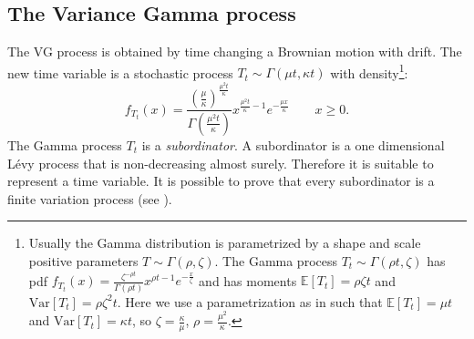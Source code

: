 \documentclass[]{interact}
\newcommand{\numberset}{\mathbb}
\newcommand{\E}{\numberset{E}}
\theoremstyle{plain}%
\theoremstyle{definition}
\theoremstyle{remark}
\begin{document}
\subsection{The Variance Gamma process}
The VG process is obtained by time changing a Brownian motion with drift. The new time variable is a stochastic process 
$T_t \sim \Gamma(\mu t,\kappa t)$ with density\footnote{Usually the Gamma distribution is 
parametrized by a shape and scale positive parameters $T \sim \Gamma(\rho,\zeta)$. The Gamma process 
$T_t \sim \Gamma(\rho t,\zeta)$ has pdf 
$f_{T_t}(x) = \frac{\zeta^{-\rho t}}{\Gamma(\rho t)}x^{\rho t -1}e^{-\frac{x}{\zeta}}$ and has moments $\E[T_t]=\rho \zeta t$ 
and $\mbox{Var}[T_t] = \rho \zeta^2 t$. Here we use a parametrization as in \cite{MCC98} such that $\E[T_t]=\mu t$ and $\mbox{Var}
[T_t] = \kappa t$, so $\zeta=\frac{\kappa}{\mu}$, $\rho=\frac{\mu^2}{\kappa}$.}:
\begin{equation}
 f_{T_t}(x)= \frac{(\frac{\mu}{\kappa})^{\frac{\mu^2 t}{\kappa}}}{\Gamma(\frac{\mu^2 t}{\kappa})}x^{\frac{\mu^2 t}{\kappa} -1}
 e^{-\frac{\mu x}{\kappa}} \hspace{2em} x \geq 0.
\end{equation}
The Gamma process $T_t$ is a \emph{subordinator}. A subordinator is a one dimensional Lévy process that is 
non-decreasing almost surely. Therefore it is suitable to represent a time variable. 
It is possible to prove that every subordinator is a finite variation process (see \cite{Applebaum}).  
\end{document}
